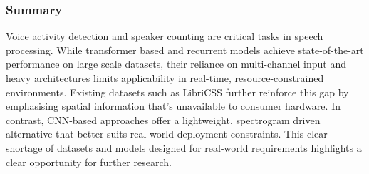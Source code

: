 \subsubsection{Summary}
Voice activity detection and speaker counting are critical tasks in speech processing. While transformer based and recurrent models achieve state-of-the-art performance on large scale datasets, their reliance on multi-channel input and heavy architectures limits applicability in real-time, resource-constrained environments. Existing datasets such as LibriCSS further reinforce this gap by emphasising spatial information that's unavailable to consumer hardware. In contrast, CNN-based approaches offer a lightweight, spectrogram driven alternative that better suits real-world deployment constraints. This clear shortage of datasets and models designed for real-world requirements highlights a clear opportunity for further research.
